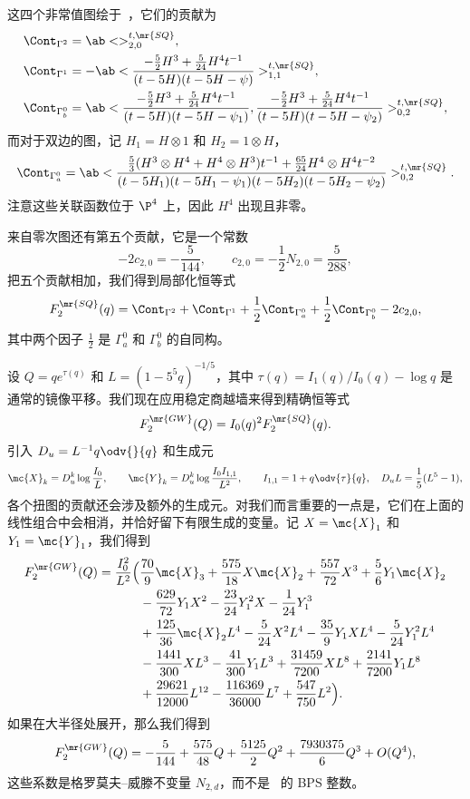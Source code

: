 这四个非常值图绘于~，它们的贡献为
\begin{align*}
    \Cont_{\Gamma^2} &= \ab<>^{t,\mr{SQ}}_{2,0}, \\
    \Cont_{\Gamma^1} &= -\ab< \frac{-\frac{5}{2}H^3 + \frac{5}{24}H^4t^{-1}}{(t-5H)(t-5H-\psi)}>^{t,\mr{SQ}}_{1,1}, \\
    \Cont_{\Gamma_b^0} &= \ab< \frac{-\frac{5}{2}H^3+\frac{5}{24}H^4t^{-1}}{(t-5H)(t-5H-\psi_1)}, \frac{-\frac{5}{2}H^3+\frac{5}{24}H^4t^{-1}}{(t-5H)(t-5H-\psi_2)}>^{t,\mr{SQ}}_{0,2},
\end{align*}
而对于双边的图，记 \(H_1 = H \otimes 1\) 和 \(H_2 = 1 \otimes H\)，
\[ \Cont_{\Gamma_a^0} = \ab< \frac{\frac{5}{3}(H^3\otimes H^4 + H^4 \otimes H^3)t^{-1} + \frac{65}{24}H^4 \otimes H^4 t^{-2}}{(t-5H_1)(t-5H_1-\psi_1)(t-5H_2)(t-5H_2-\psi_2)}>^{t,\mr{SQ}}_{0,2}. \]
注意这些关联函数位于 \(\P^4\) 上，因此 \(H^4\) 出现且非零。

来自零次图还有第五个贡献，它是一个常数
\[ -2c_{2,0} = -\frac{5}{144}, \qquad c_{2,0} = -\frac{1}{2}N_{2,0} = \frac{5}{288}, \]
把五个贡献相加，我们得到局部化恒等式
\[ F_2^{\mr{SQ}}(q) = \Cont_{\Gamma^2} + \Cont_{\Gamma^1} + \frac{1}{2}\Cont_{\Gamma_a^0} + \frac{1}{2}\Cont_{\Gamma_b^0} - 2c_{2,0}, \]
其中两个因子 \(\frac{1}{2}\) 是 \(\Gamma_a^0\) 和 \(\Gamma_b^0\) 的自同构。

设 \(Q = qe^{\tau(q)}\) 和 \(L = (1-5^5q)^{-1/5}\)，其中 \(\tau(q) = I_1(q)/I_0(q) - \log q\) 是通常的镜像平移。我们现在应用稳定商越墙来得到精确恒等式
\[ F_2^{\mr{GW}}(Q) = I_0(q)^2 F_2^{\mr{SQ}}(q). \]
引入 \(D_u = L^{-1}q\odv{}{q}\) 和生成元
\[ \mc{X}_k = D_u^k \log \frac{I_0}{L}, \qquad \mc{Y}_k = D_u^k \log \frac{I_0I_{1,1}}{L^2}, \qquad I_{1,1} = 1 + q \odv{\tau}{q}, \quad D_u L = \frac{1}{5}(L^5-1), \]
各个扭图的贡献还会涉及额外的生成元。对我们而言重要的一点是，它们在上面的线性组合中会相消，并恰好留下有限生成的变量。记 \(X = \mc{X}_1\) 和 \(Y_1 = \mc{Y}_1\)，我们得到
\begin{align*}
    F^{\mr{GW}}_2(Q) = \frac{I_0^2}{L^2}\Big(&\frac{70}{9}\mc{X}_3 + \frac{575}{18}X\mc{X}_2 + \frac{557}{72}X^3 + \frac{5}{6}Y_1\mc{X}_2 \\
    &- \frac{629}{72}Y_1X^2 - \frac{23}{24}Y_1^2 X - \frac{1}{24}Y_1^3 \\
    &+ \frac{125}{36}\mc{X}_2 L^4 - \frac{5}{24}X^2L^4 - \frac{35}{9}Y_1XL^4 - \frac{5}{24}Y_1^2L^4 \\
    &- \frac{1441}{300}XL^3 - \frac{41}{300}Y_1L^3 + \frac{31459}{7200}XL^8 + \frac{2141}{7200}Y_1L^8 \\
    &+ \frac{29621}{12000}L^{12} - \frac{116369}{36000}L^7 + \frac{547}{750}L^2\Big).
\end{align*}
如果在大半径处展开，那么我们得到
\[ F_2^{\mr{GW}}(Q) = -\frac{5}{144} + \frac{575}{48}Q + \frac{5125}{2}Q^2 + \frac{7930375}{6}Q^3 + O(Q^4), \]
这些系数是格罗莫夫–威滕不变量 \(N_{2,d}\)，而不是~ 的 BPS 整数。

